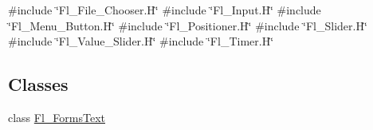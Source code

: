 {\ttfamily \#include \char`\"{}Fl\+\_\+\+File\+\_\+\+Chooser.\+H\char`\"{}}\newline
{\ttfamily \#include \char`\"{}Fl\+\_\+\+Input.\+H\char`\"{}}\newline
{\ttfamily \#include \char`\"{}Fl\+\_\+\+Menu\+\_\+\+Button.\+H\char`\"{}}\newline
{\ttfamily \#include \char`\"{}Fl\+\_\+\+Positioner.\+H\char`\"{}}\newline
{\ttfamily \#include \char`\"{}Fl\+\_\+\+Slider.\+H\char`\"{}}\newline
{\ttfamily \#include \char`\"{}Fl\+\_\+\+Value\+\_\+\+Slider.\+H\char`\"{}}\newline
{\ttfamily \#include \char`\"{}Fl\+\_\+\+Timer.\+H\char`\"{}}\newline
\subsection*{Classes}
\begin{DoxyCompactItemize}
\item 
class \hyperlink{class_fl___forms_text}{Fl\+\_\+\+Forms\+Text}
\end{DoxyCompactItemize}
